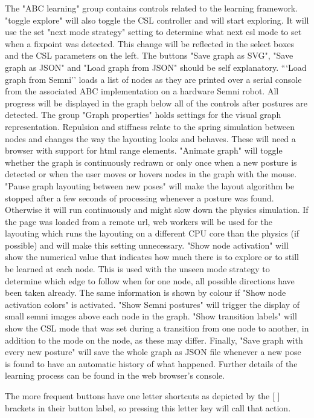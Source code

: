 \documentclass[10pt,a4paper]{article}
\begin{document}
The "ABC learning" group contains controls related to the learning framework. "toggle explore" will also toggle the CSL controller and will start exploring. It will use the set "next mode strategy" setting to determine what next csl mode to set when a fixpoint was detected. This change will be reflected in the select boxes and the CSL parameters on the left.
The buttons "Save graph as SVG", "Save graph as JSON" and "Load graph from JSON" should be self explanatory. ```Load graph from Semni'' loads a list of nodes as they are printed over a serial console from the associated ABC implementation on a hardware Semni robot.
All progress will be displayed in the graph below all of the controls after postures are detected. The group "Graph properties" holds settings for the visual graph representation. Repulsion and stiffness relate to the spring simulation between nodes and changes the way the layouting looks and behaves. These will need a browser with support for html range elements. "Animate graph" will toggle whether the graph is continuously redrawn or only once when a new posture is detected or when the user moves or hovers nodes in the graph with the mouse. "Pause graph layouting between new poses" will make the layout algorithm be stopped after a few seconds of processing whenever a posture was found. Otherwise it will run continuously and might slow down the physics simulation. If the page was loaded from a remote url, web workers will be used for the layouting which runs the layouting on a different CPU core than the physics (if possible) and will make this setting unnecessary.
"Show node activation" will show the numerical value that indicates how much there is to explore or to still be learned at each node. This is used with the unseen mode strategy to determine which edge to follow when for one node, all possible directions have been taken already. The same information is shown by colour if "Show node activation colors" is activated. "Show Semni postures" will trigger the display of small semni images above each node in the graph. "Show transition labels" will show the CSL mode that was set during a transition from one node to another, in addition to the mode on the node, as these may differ. Finally, "Save graph with every new posture" will save the whole graph as JSON file whenever a new pose is found to have an automatic history of what happened.
Further details of the learning process can be found in the web browser's console.

The more frequent buttons have one letter shortcuts as depicted by the [ ] brackets in their button label, so pressing this letter key will call that action.
\end{document}
